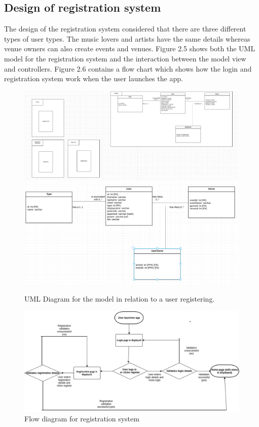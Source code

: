 \subsection{Design of registration system}
The design of the registration system considered that there are three different types of user types. The music lovers and artists have the same details whereas venue owners can also create events and venues. Figure 2.5 shows both the UML model for the registration system and the interaction between the model view and controllers. Figure 2.6  contains a flow chart which shows how the login and registration system work when the user launches the app.

\begin{figure}[H]
\includegraphics[width=\textwidth,height=\textheight,keepaspectratio]{images/register}
\includegraphics[width=\textwidth,height=\textheight,keepaspectratio]{images/users}
\caption{UML Diagram for the model in relation to a user registering.}
\end{figure}

\begin{figure}[H]
\includegraphics[width=\textwidth,height=\textheight,keepaspectratio]{images/flow}
\caption{Flow diagram for registration system}
\end{figure}



